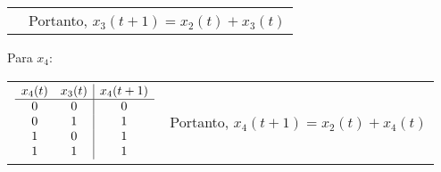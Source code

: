 \documentclass[12pt]{article}
\begin{document}
{\begin{tabular}{c l}
&


Portanto, $x_3 (t + 1) = x_2 (t) + x_3 (t)$ 
\end{tabular}

\bigbreak
Para $x_4$:
\vspace{.2cm}
\begin{tabular}{c l}
$\begin{array}{cc | c}
  x_4 (t) &  x_3 (t) & x_4 (t + 1) \\
  \hline
    0     &     0    &     0       \\
    0     &     1    &     1       \\
    1     &     0    &     1       \\
    1     &     1    &     1       
\end{array}$

&


Portanto, $x_4 (t + 1) = x_2 (t) + x_4 (t)$ 
\end{tabular}
}
\end{document}
